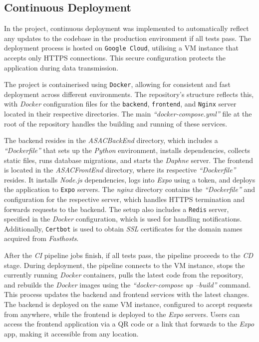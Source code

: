 \subsection{Continuous Deployment}

In the project, continuous deployment was implemented to automatically reflect any updates to the codebase in the production environment if all tests pass. The deployment process is hosted on \texttt{Google Cloud}, utilising a VM instance that accepts only HTTPS connections. This secure configuration protects the application during data transmission.

The project is containerised using \texttt{Docker}, allowing for consistent and fast deployment across different environments. The repository's structure reflects this, with \textit{Docker} configuration files for the \texttt{backend}, \texttt{frontend}, and \texttt{Nginx} server located in their respective directories. The main \textit{``docker-compose.yml''} file at the root of the repository handles the building and running of these services.

The backend resides in the \textit{ASACBackEnd} directory, which includes a \textit{``Dockerfile''} that sets up the \textit{Python} environment, installs dependencies, collects static files, runs database migrations, and starts the \textit{Daphne} server. The frontend is located in the \textit{ASACFrontEnd} directory, where its respective \textit{``Dockerfile''} resides. It installs \textit{Node.js} dependencies, logs into \textit{Expo} using a token, and deploys the application to \texttt{Expo} servers. The \textit{nginx} directory contains the \textit{``Dockerfile''} and configuration for the respective server, which handles HTTPS termination and forwards requests to the backend. The setup also includes a \texttt{Redis} server, specified in the \textit{Docker} configuration, which is used for handling notifications. Additionally, \texttt{Certbot} is used to obtain \textit{SSL} certificates for the domain names acquired from \textit{Fasthosts}.

After the \textit{CI} pipeline jobs finish, if all tests pass, the pipeline proceeds to the \textit{CD} stage. During deployment, the pipeline connects to the VM instance, stops the currently running \textit{Docker} containers, pulls the latest code from the repository, and rebuilds the \textit{Docker} images using the \textit{``docker-compose up --build''} command. This process updates the backend and frontend services with the latest changes. The backend is deployed on the same VM instance, configured to accept requests from anywhere, while the frontend is deployed to the \textit{Expo} servers. Users can access the frontend application via a QR code or a link that forwards to the \textit{Expo} app, making it accessible from any location.

